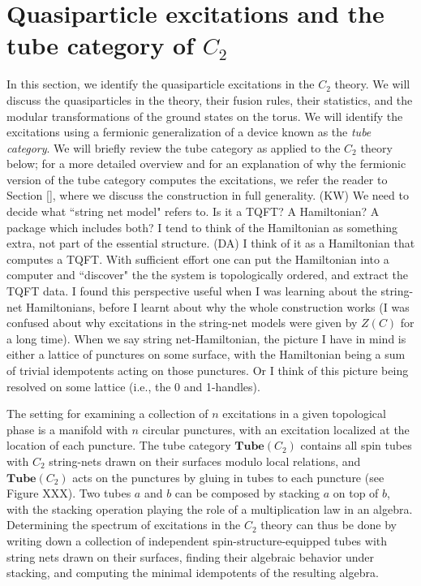 \documentclass[12pt,a4paper]{article}
\newcommand{\tube}{\textbf{Tube}}
\newcommand{\dave}[1]{{\color{ao(english)}\footnotesize{(DA) #1}}}
\newcommand{\kw}[1]{{\color{kwcolor}\footnotesize{(KW) #1}}}
\begin{document}
\section{Quasiparticle excitations and the tube category of $C_2$} \label{C2_quasiparticles}

In this section, we identify the quasiparticle excitations 
in the $C_2$ theory.
We will discuss the quasiparticles in the theory, their fusion rules, their statistics, and the modular transformations of the ground states on the torus.
We will identify the excitations using a fermionic generalization of a device known as the {\it tube category}. 
We will briefly review the tube category as applied to the $C_2$ theory below; for a more detailed overview and for an explanation of why the fermionic version of the tube category computes the excitations, we refer the reader to Section \ref{}, where we discuss the construction in full generality. 
\kw{We need to decide what ``string net model" refers to.
Is it a TQFT?  A Hamiltonian?  A package which includes both?
I tend to think of the Hamiltonian as something extra, not part of the essential structure.}
\dave{I think of it as a Hamiltonian that computes a TQFT.
With sufficient effort one can put the Hamiltonian into a computer and ``discover" the the system is topologically ordered, and extract the TQFT data.
I found this perspective useful when I was learning about the string-net Hamiltonians, before I learnt about why the whole construction works (I was confused about why excitations in the string-net models were given by $Z(C)$ for a long time). 
When we say string net-Hamiltonian, the picture I have in mind is either a lattice of punctures on some surface, with the Hamiltonian being a sum of trivial idempotents acting on those punctures. 
Or I think of this picture being resolved on some lattice (i.e., the 0 and 1-handles).
}

The setting for examining a collection of $n$ excitations in a given topological phase is a manifold with $n$ circular punctures, with an excitation localized at the location of each puncture. 
The tube category $\tube(C_2)$ contains all spin tubes with $C_2$ string-nets drawn on their surfaces modulo local relations, and $\tube(C_2)$ acts on the punctures by gluing in tubes to each puncture (see Figure XXX). 
Two tubes $a$ and $b$ can be composed by stacking $a$ on top of $b$, with the stacking operation playing the role of a multiplication law in an algebra. 
Determining the spectrum of excitations in the $C_2$ theory can thus be done by writing down a collection of independent spin-structure-equipped tubes with string nets drawn on their surfaces, finding their algebraic behavior under stacking, and computing the minimal idempotents of the resulting algebra. 
\end{document}
